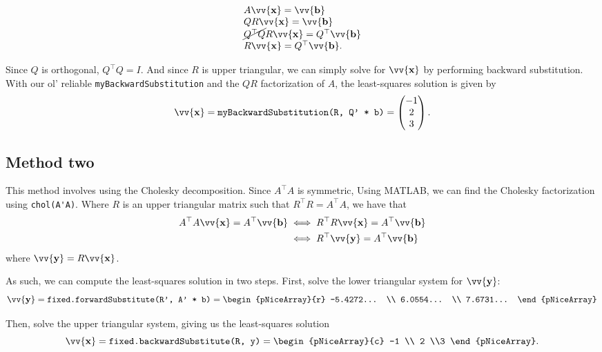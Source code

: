 \documentclass[12pt]{article}
\newcommand{\vect}[1]{\vv{\mathbf{#1}}}
\newcommand{\code}[1]{\texttt{#1}}
\begin{document}
$$
\begin{array}{ll}
A\vect{x} = \vect{b} \\
QR\vect{x} = \vect{b} \\
\cancel{Q^\top Q}R\vect{x} = Q^\top\vect{b}  \\
R\vect{x} = Q^\top\vect{b}.
\end{array}
$$

Since $Q$ is orthogonal, $Q^\top Q=I$. And since $R$ is upper triangular, we can simply solve for $\vect{x}$ by performing backward substitution. With our ol' reliable \code{myBackwardSubstitution} and the $QR$ factorization of $A$, the least-squares solution is given by
$$
\vect{x} = \code{myBackwardSubstitution(R, Q' * b)} = \begin{pmatrix}
    -1 \\ 2 \\ 3
\end{pmatrix}.
$$

\subsection*{Method two}

This method involves using the Cholesky decomposition. Since $A^\top A$ is symmetric, Using MATLAB, we can find the Cholesky factorization using \verb|chol(A'A)|. Where $R$ is  an upper triangular matrix such that $R^\top R = A^\top A$, we have that
\begin{align*}
    A^\top A\vect{x} = A^\top\vect{b} &\iff R^\top R\vect{x} = A^\top\vect{b} \\
    &\iff R^\top\vect{y} = A^\top\vect{b}
\end{align*}
where $\vect{y} = R\vect{x}$.

As such, we can compute the least-squares solution in two steps. First, solve the lower triangular system for $\vect{y}$:
$$
\vect{y} = \code{fixed.forwardSubstitute(R', A' * b)} = \begin{pNiceArray}{r}
    -5.4272... \\
    6.0554... \\
    7.6731...
\end{pNiceArray}
$$

Then, solve the upper triangular system, giving us the least-squares solution
$$
\vect{x} = \code{fixed.backwardSubstitute(R, y)} = \begin{pNiceArray}{c}
    -1 \\ 2 \\3
\end{pNiceArray}.
$$
\end{document}
